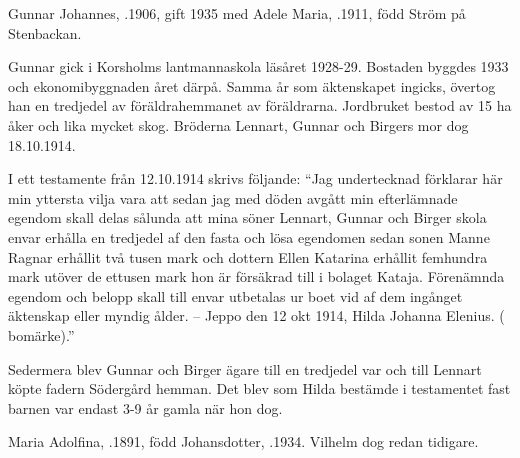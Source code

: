 %
Gunnar Johannes, .1906, gift 1935 med Adele Maria, .1911, född Ström på Stenbackan.
\begin{jhchildren}
  \item {}
  \item {}
  \item {}
  \item {}
\end{jhchildren}
Gunnar gick i Korsholms lantmannaskola läsåret 1928-29. Bostaden byggdes 1933 och ekonomibyggnaden året därpå. Samma år som äktenskapet ingicks, övertog han en tredjedel av föräldrahemmanet av föräldrarna. Jordbruket bestod av 15 ha åker och lika mycket skog. Bröderna Lennart, Gunnar och Birgers mor dog 18.10.1914.

I ett testamente från 12.10.1914 skrivs följande: ``Jag undertecknad förklarar här min yttersta vilja vara att sedan jag 	med döden avgått min efterlämnade egendom skall delas sålunda att mina söner Lennart, Gunnar och Birger skola envar erhålla en tredjedel af den fasta och lösa egendomen sedan sonen Manne Ragnar erhållit två tusen mark och dottern Ellen Katarina erhållit femhundra mark utöver de ettusen mark hon är försäkrad till i bolaget Kataja. Förenämnda egendom och belopp skall till envar utbetalas ur boet vid af dem ingånget äktenskap eller myndig ålder. -- Jeppo den 12 okt 1914, Hilda Johanna Elenius. ( bomärke).''

Sedermera blev Gunnar och Birger ägare till en tredjedel var och till Lennart köpte fadern Södergård hemman. Det blev som Hilda bestämde i testamentet fast barnen var endast 3-9 år gamla när hon dog.



%


%
Maria Adolfina, .1891, född Johansdotter, .1934.	Vilhelm dog redan tidigare.

